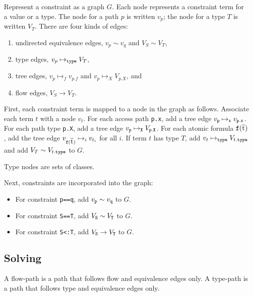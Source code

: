 \documentclass[preprint,nocopyrightspace,9pt]{sigplanconf}
\newcommand\xbar[1]{\ensuremath{\bar{\Xcd{#1}}}}
\begin{document}
{%
\newcommand\eqedge{\sim}
\newcommand\flowedge{\to}
\newcommand\treeedge[1]{\mapsto_{#1}}
\newcommand\typeedge{\mapsto_{\tt type}}

Represent a constraint as a graph $G$.
Each node represents a constraint term for a value or a type.
The node for a path $p$ is written $v_p$;
the node for a type $T$ is written $V_T$.
There are four kinds of edges:
\begin{enumerate}
\item undirected equivalence edges,
        $v_p \eqedge v_q$ and $V_S \eqedge V_T$,
\item type edges, $v_p \typeedge V_T$,
\item tree edges, $v_p \treeedge{f} v_{p.f}$
              and $v_p \treeedge{X} V_{p.X}$, and
\item flow edges, $V_S \flowedge V_T$.
\end{enumerate}

First, each constraint term is mapped to a node in the graph as
follows.
Associate each term $t$ with a node
$v_t$.  For each access path {\tt p.x}, add a tree edge
$v_{{\tt p}} \treeedge{{\tt x}} v_{{\tt p.x}}$.
For each path type {\tt p.X}, add a tree edge
$v_{{\tt p}} \treeedge{{\tt X}} V_{{\tt p.X}}$.
For each atomic formula ${\tt f}(\xbar{t})$, add the tree edge
$v_{{\tt f}(\xbar{t})} \treeedge{i} v_{t_i}$ for all $i$.
If term $t$ has type $T$, add $v_t \typeedge V_{t{\tt .type}}$
and
add $V_T \eqedge V_{t{\tt .type}}$ to $G$.

Type nodes are sets of classes.

Next, constraints are incorporated into the graph:

\begin{itemize}
\item
For constraint {\tt p==q}, add $v_{\tt p} \eqedge v_{\tt q}$ to $G$.

\item
For constraint {\tt S==T}, add $V_{\tt S} \eqedge V_{\tt T}$ to $G$.

\item
For constraint {\tt S<:T},
add $V_{\tt S} \flowedge V_{\tt T}$
to $G$.

\end{itemize}

\subsection{Solving}

A flow-path is a path that follows flow and equivalence edges
only.
A type-path is a path that follows type and equivalence edges
only.

}
\end{document}
